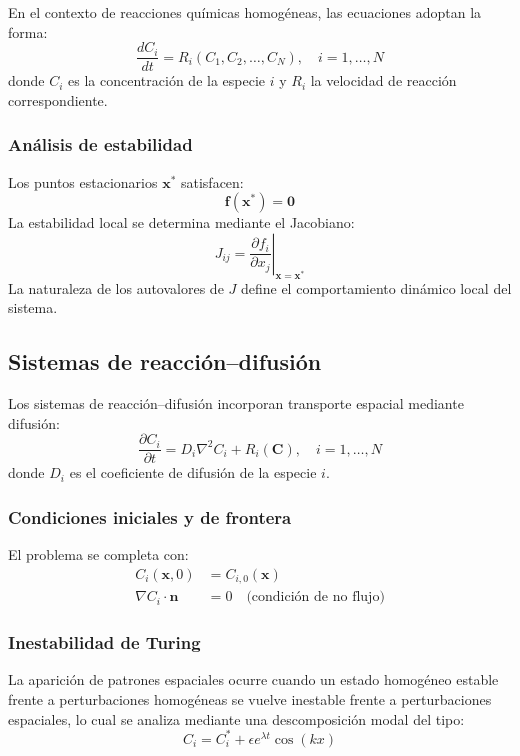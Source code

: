 \documentclass[12pt,letterpaper]{article}
\begin{document}
	En el contexto de reacciones químicas homogéneas, las ecuaciones adoptan la forma:
	\begin{equation}
		\frac{dC_i}{dt} = R_i(C_1,C_2,\dots,C_N), \quad i=1,\dots,N
	\end{equation}
	donde $C_i$ es la concentración de la especie $i$ y $R_i$ la velocidad de reacción correspondiente.
	
	\subsubsection{Análisis de estabilidad}
	Los puntos estacionarios $\bm{x}^*$ satisfacen:
	\begin{equation}
		\bm{f}(\bm{x}^*) = \bm{0}
	\end{equation}
	La estabilidad local se determina mediante el Jacobiano:
	\begin{equation}
		J_{ij} = \left.\frac{\partial f_i}{\partial x_j}\right|_{\bm{x}=\bm{x}^*}
	\end{equation}
	La naturaleza de los autovalores de $J$ define el comportamiento dinámico local del sistema.
	
	\subsection{Sistemas de reacción--difusión}
	Los sistemas de reacción--difusión incorporan transporte espacial mediante difusión:
	\begin{equation}
		\frac{\partial C_i}{\partial t} =
		D_i \nabla^2 C_i + R_i(\bm{C}), \quad i=1,\dots,N
	\end{equation}
	donde $D_i$ es el coeficiente de difusión de la especie $i$.
	
	\subsubsection{Condiciones iniciales y de frontera}
	El problema se completa con:
	\begin{align}
		C_i(\bm{x},0) &= C_{i,0}(\bm{x}) \\
		\nabla C_i \cdot \bm{n} &= 0 \quad \text{(condición de no flujo)}
	\end{align}
	
	\subsubsection{Inestabilidad de Turing}
	La aparición de patrones espaciales ocurre cuando un estado homogéneo estable frente a perturbaciones homogéneas se vuelve inestable frente a perturbaciones espaciales, lo cual se analiza mediante una descomposición modal del tipo:
	\begin{equation}
		C_i = C_i^* + \epsilon e^{\lambda t} \cos(kx)
	\end{equation}
	
\end{document}
